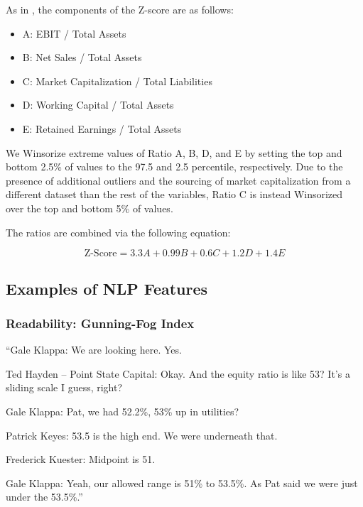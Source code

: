 \documentclass{article}[11pt]
\begin{document}
    \label{sec:altman-z-score}

    As in \cite{das_credit_2023}, the components of the Z-score are as follows:

    \begin{itemize}
        \item A: EBIT / Total Assets
        \item B: Net Sales / Total Assets
        \item C: Market Capitalization / Total Liabilities
        \item D: Working Capital / Total Assets
        \item E: Retained Earnings / Total Assets
    \end{itemize}

    We Winsorize extreme values of Ratio A, B, D, and E by setting the top and bottom 2.5\% of values to the 97.5 and 2.5 percentile, respectively. Due to the presence of additional outliers and the sourcing of market capitalization from a different dataset than the rest of the variables, Ratio C is instead Winsorized over the top and bottom 5\% of values. 

    The ratios are combined via the following equation:

    \begin{equation*}
        \text{Z-Score} = 3.3 A + 0.99 B + 0.6 C + 1.2 D + 1.4 E
    \end{equation*}

    \clearpage
    \newpage

    \subsection{Examples of NLP Features}

    \label{sec:nlp-examples}

    \subsubsection{Readability: Gunning-Fog Index}

    \begin{em}
        ``Gale Klappa: We are looking here. Yes.

        Ted Hayden – Point State Capital: Okay. And the equity ratio is like 53? It’s a sliding scale I guess, right?

        Gale Klappa: Pat, we had 52.2\%, 53\% up in utilities?
        
        Patrick Keyes: 53.5 is the high end. We were underneath that.
        
        Frederick Kuester: Midpoint is 51.
        
        Gale Klappa: Yeah, our allowed range is 51\% to 53.5\%. As Pat said we were just under the 53.5\%.''
    \end{em}
\end{document}
